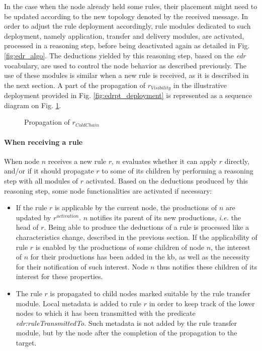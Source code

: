 \documentclass[sw]{iosart2x}
\begin{document}
In the case when the node already held some rules, their placement might need to be updated according to the new topology denoted by the received message.
In order to adjust the rule deployment accordingly, rule modules dedicated to such deployment, namely application, transfer and delivery modules, are activated, processed in a reasoning step, before being deactivated again as detailed in Fig. \ref{fig:edr_algo}.
The deductions yielded by this reasoning step, based on the \textit{edr} vocabulary, are used to control the node behavior as described previously.
The use of these modules is similar when a new rule is received, as it is described in the next section.
A part of the propagation of $r_{Visibility}$ in the illustrative deployment provided in Fig. \ref{fig:edrpt_deployment} is represented as a sequence diagram on Fig. \ref{fig:seq_temperaturegap}.

\begin{figure}
	\centering
	\caption{Propagation of $r_{ColdChain}$}
	\label{fig:seq_temperaturegap}
	\scalebox{0.8}{
		
	}
\end{figure}

\paragraph{When receiving a rule}

When node $n$ receives a new rule $r$, $n$ evaluates whether it can apply $r$ directly, and/or if it should propagate $r$ to some of its children by performing a reasoning step with all modules of $r$ activated. 
Based on the deductions produced by this reasoning step, some node functionalities are activated if necessary: 
\begin{itemize}
	\item If the rule $r$ is applicable by the current node, the productions of $n$ are updated by $r^{activation}$.
	$n$ notifies its parent of its new productions, \textit{i.e.} the head of $r$.
	Being able to produce the deductions of a rule is processed like a characteristics change, described in the previous section.
	If the applicability of rule $r$ is enabled by the productions of some children of node $n$, the interest of $n$ for their productions has been added in the \gls{kb}, as well as the necessity for their notification of such interest.
	Node $n$ thus notifies these children of its interest for these properties.
	\item The rule $r$ is propagated to child nodes marked suitable by the rule transfer module. 
	Local metadata is added to rule $r$ in order to keep track of the lower nodes to which it has been transmitted with the predicate \textit{edr:rule\-Transmitted\-To}. 
	Such metadata is not added by the rule transfer module, but by the node after the completion of the propagation to the target.
\end{itemize}
\end{document}
